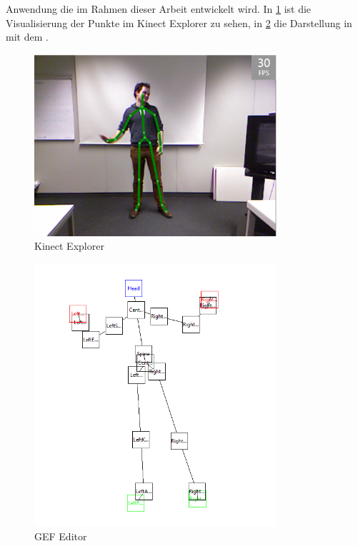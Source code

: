 Anwendung die im Rahmen dieser Arbeit entwickelt wird. In \ref{fig:kinectexplorer} ist die Visualisierung der Punkte im Kinect Explorer zu sehen, 
in \ref{fig:gef} die Darstellung in mit dem .
\par\smallskip 
\begin{figure}[htb]
\centering
\includegraphics[width=0.8\textwidth]{img/04kapitel/kinectexplorer.png}
\caption[Kinect Explorer]{Kinect Explorer\footnotemark[4]}
\label{fig:kinectexplorer}
\end{figure}
\begin{figure}[!]
\centering
\includegraphics[width=0.8\textwidth]{img/04kapitel//gefeditor.png}
\caption[GEF Editor]{GEF Editor}
\label{fig:gef}
\end{figure}

